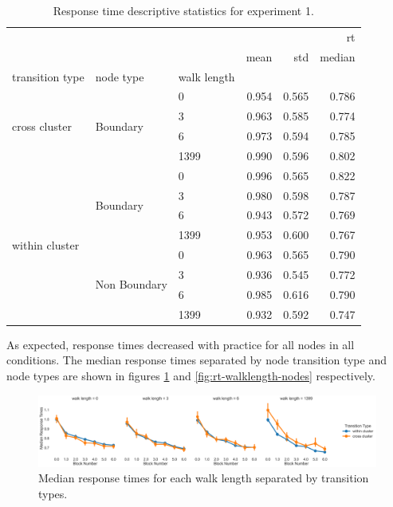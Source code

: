 \begin{table}	
	\centering
	\caption{Response time descriptive statistics for experiment 1.}
	\label{tab:exp1-rt-stats}
	\begin{tabular}{lllrrr}
		\toprule
		 &  &  & \multicolumn{3}{r}{rt} \\
		 &  &  & mean & std & median \\
		transition type & node type & walk length &  &  &  \\
		\midrule
		\multirow[t]{4}{*}{cross cluster} & \multirow[t]{4}{*}{Boundary} & 0 & 0.954 & 0.565 & 0.786 \\
		 &  & 3 & 0.963 & 0.585 & 0.774 \\
		 &  & 6 & 0.973 & 0.594 & 0.785 \\
		 &  & 1399 & 0.990 & 0.596 & 0.802 \\
		\cline{1-6} \cline{2-6}
		\multirow[t]{8}{*}{within cluster} & \multirow[t]{4}{*}{Boundary} & 0 & 0.996 & 0.565 & 0.822 \\
		 &  & 3 & 0.980 & 0.598 & 0.787 \\
		 &  & 6 & 0.943 & 0.572 & 0.769 \\
		 &  & 1399 & 0.953 & 0.600 & 0.767 \\
		\cline{2-6}
		 & \multirow[t]{4}{*}{Non Boundary} & 0 & 0.963 & 0.565 & 0.790 \\
		 &  & 3 & 0.936 & 0.545 & 0.772 \\
		 &  & 6 & 0.985 & 0.616 & 0.790 \\
		 &  & 1399 & 0.932 & 0.592 & 0.747 \\
		\cline{1-6} \cline{2-6}
		\bottomrule
		\end{tabular}
	\end{table}
	

As expected, response times decreased with practice for all nodes in all conditions. The median response times separated by node transition type and node types are shown in figures \ref{fig:rt-walklength-transitions} and \ref{fig:rt-walklength-nodes} respectively. 

\begin{figure}
	\centering
	\label{fig:rt-walklength-transitions}
	\includegraphics[width = \textwidth]{chapter_notebooks/chapter_2/figures/median_rts_transitiontype.png}
	\caption{Median response times for each walk length separated by transition types.}
\end{figure}


